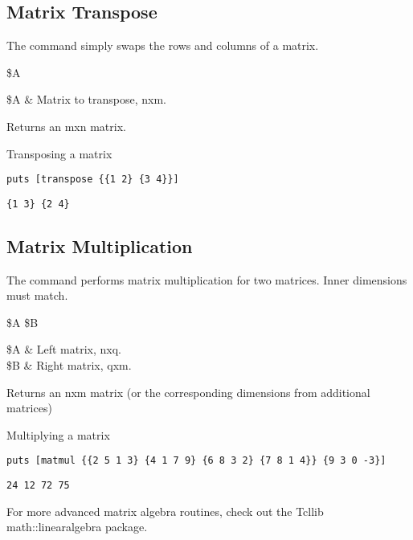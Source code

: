 \documentclass{article}
\begin{document}
\subsection{Matrix Transpose}
The command  simply swaps the rows and columns of a matrix. 
\begin{syntax}
 \$A
\end{syntax}
\begin{args}
\$A & Matrix to transpose, nxm.
\end{args}
Returns an mxn matrix.
\begin{example}{Transposing a matrix}
\begin{lstlisting}
puts [transpose {{1 2} {3 4}}]
\end{lstlisting}
\tcblower
\begin{lstlisting}
{1 3} {2 4}
\end{lstlisting}
\end{example}

\subsection{Matrix Multiplication}
The command  performs matrix multiplication for two matrices.
Inner dimensions must match.
\begin{syntax}
 \$A \$B
\end{syntax}
\begin{args}
\$A & Left matrix, nxq. \\
\$B & Right matrix, qxm. 
\end{args}
Returns an nxm matrix (or the corresponding dimensions from additional matrices)
\begin{example}{Multiplying a matrix}
\begin{lstlisting}
puts [matmul {{2 5 1 3} {4 1 7 9} {6 8 3 2} {7 8 1 4}} {9 3 0 -3}]
\end{lstlisting}
\tcblower
\begin{lstlisting}
24 12 72 75
\end{lstlisting}
\end{example}

For more advanced matrix algebra routines, check out the Tcllib math::linearalgebra package.

\clearpage
\end{document}
